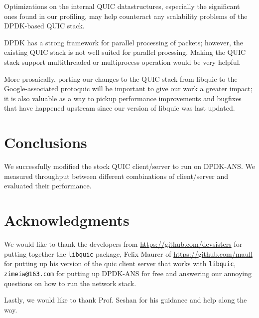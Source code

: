 \documentclass{sig-alternate-05-2015}
\begin{document}
Optimizations on the internal QUIC datastructures,
especially the significant ones found in our profiling,
may help counteract any scalability problems of the DPDK-based QUIC stack.

DPDK has a strong framework for parallel processing of packets;
however, the existing QUIC stack is not well suited for parallel procssing.
Making the QUIC stack support multithreaded or multiprocess operation would be very helpful.

More prosaically, porting our changes to the QUIC stack from libquic
to the Google-associated protoquic
will be important to give our work a greater impact;
it is also valuable as a way to pickup performance improvements and bugfixes that have happened upstream
since our version of libquic was last updated.

\section{Conclusions}
We successfully modified the stock QUIC client/server to run on DPDK-ANS. We measured throughput between different combinations of client/server and evaluated their performance.

\section{Acknowledgments}
We would like to thank the developers from \url{https://github.com/devsisters} for putting together the \texttt{libquic} package, Felix Maurer of \url{https://github.com/maufl} for putting up his version of the quic client server that works with \texttt{libquic}, \texttt{zimeiw@163.com} for putting up DPDK-ANS for free and answering our annoying questions on how to run the network stack.

Lastly, we would like to thank Prof. Seshan for his guidance and help along the way.




\end{document}
